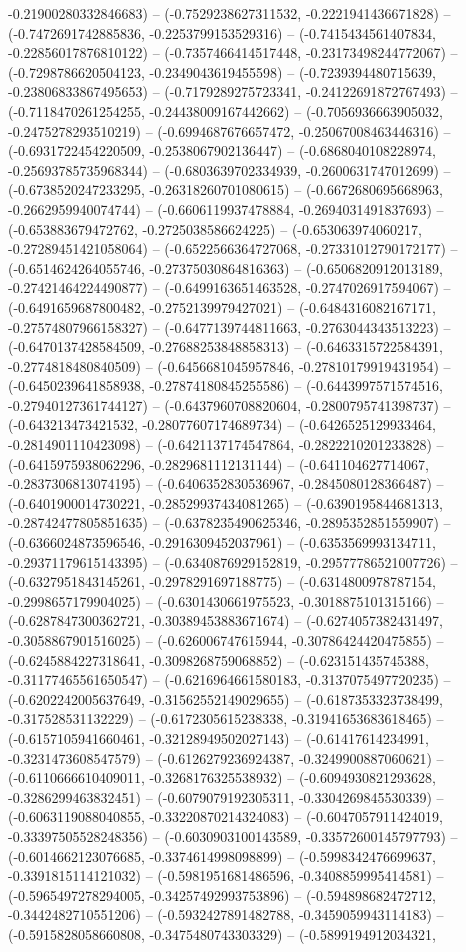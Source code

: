 -0.21900280332846683) -- (-0.7529238627311532, -0.2221941436671828) -- (-0.7472691742885836, -0.2253799153529316) -- (-0.7415434561407834, -0.22856017876810122) -- (-0.7357466414517448, -0.23173498244772067) -- (-0.7298786620504123, -0.2349043619455598) -- (-0.7239394480715639, -0.23806833867495653) -- (-0.7179289275723341, -0.24122691872767493) -- (-0.7118470261254255, -0.24438009167442662) -- (-0.7056936663905032, -0.2475278293510219) -- (-0.6994687676657472, -0.25067008463446316) -- (-0.6931722454220509, -0.2538067902136447) -- (-0.6868040108228974, -0.25693785735968344) -- (-0.6803639702334939, -0.2600631747012699) -- (-0.6738520247233295, -0.26318260701080615) -- (-0.6672680695668963, -0.2662959940074744) -- (-0.6606119937478884, -0.2694031491837693) -- (-0.653883679472762, -0.2725038586624225) -- (-0.653063974060217, -0.27289451421058064) -- (-0.6522566364727068, -0.27331012790172177) -- (-0.6514624264055746, -0.27375030864816363) -- (-0.6506820912013189, -0.27421464224490877) -- (-0.6499163651463528, -0.2747026917594067) -- (-0.6491659687800482, -0.2752139979427021) -- (-0.6484316082167171, -0.27574807966158327) -- (-0.6477139744811663, -0.2763044343513223) -- (-0.6470137428584509, -0.27688253848858313) -- (-0.6463315722584391, -0.2774818480840509) -- (-0.6456681045957846, -0.27810179919431954) -- (-0.6450239641858938, -0.27874180845255586) -- (-0.6443997571574516, -0.27940127361744127) -- (-0.6437960708820604, -0.2800795741398737) -- (-0.643213473421532, -0.28077607174689734) -- (-0.6426525129933464, -0.2814901110423098) -- (-0.6421137174547864, -0.2822210201233828) -- (-0.6415975938062296, -0.2829681112131144) -- (-0.641104627714067, -0.2837306813074195) -- (-0.6406352830536967, -0.2845080128366487) -- (-0.6401900014730221, -0.28529937434081265) -- (-0.6390195844681313, -0.28742477805851635) -- (-0.6378235490625346, -0.2895352851559907) -- (-0.6366024873596546, -0.2916309452037961) -- (-0.6353569993134711, -0.29371179615143395) -- (-0.6340876929152819, -0.29577786521007726) -- (-0.6327951843145261, -0.2978291697188775) -- (-0.6314800978787154, -0.2998657179904025) -- (-0.6301430661975523, -0.3018875101315166) -- (-0.6287847300362721, -0.30389453883671674) -- (-0.6274057382431497, -0.3058867901516025) -- (-0.626006747615944, -0.30786424420475855) -- (-0.6245884227318641, -0.3098268759068852) -- (-0.623151435745388, -0.31177465561650547) -- (-0.6216964661580183, -0.3137075497720235) -- (-0.6202242005637649, -0.31562552149029655) -- (-0.6187353323738499, -0.317528531132229) -- (-0.6172305615238338, -0.31941653683618465) -- (-0.6157105941660461, -0.32128949502027143) -- (-0.61417614234991, -0.3231473608547579) -- (-0.6126279236924387, -0.3249900887060621) -- (-0.6110666610409011, -0.3268176325538932) -- (-0.6094930821293628, -0.3286299463832451) -- (-0.6079079192305311, -0.3304269845530339) -- (-0.6063119088040855, -0.33220870214324083) -- (-0.6047057911424019, -0.33397505528248356) -- (-0.6030903100143589, -0.33572600145797793) -- (-0.6014662123076685, -0.3374614998098899) -- (-0.5998342476699637, -0.3391815114121032) -- (-0.5981951681486596, -0.3408859995414581) -- (-0.5965497278294005, -0.34257492993753896) -- (-0.594898682472712, -0.3442482710551206) -- (-0.5932427891482788, -0.3459059943114183) -- (-0.5915828058660808, -0.3475480743303329) -- (-0.5899194912034321, 